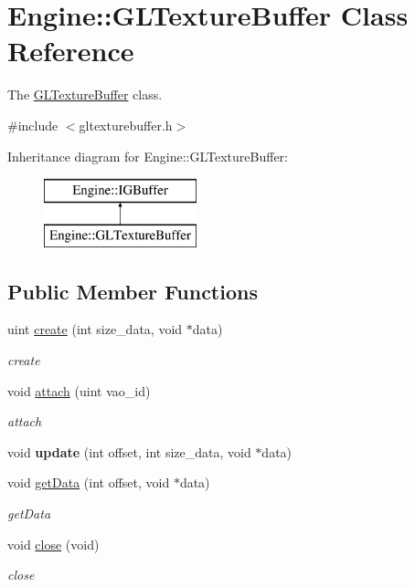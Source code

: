 \hypertarget{classEngine_1_1GLTextureBuffer}{}\section{Engine\+:\+:G\+L\+Texture\+Buffer Class Reference}
\label{classEngine_1_1GLTextureBuffer}


The \hyperlink{classEngine_1_1GLTextureBuffer}{G\+L\+Texture\+Buffer} class.  




{\ttfamily \#include $<$gltexturebuffer.\+h$>$}

Inheritance diagram for Engine\+:\+:G\+L\+Texture\+Buffer\+:\begin{figure}[H]
\begin{center}
\leavevmode
\includegraphics[height=2.000000cm]{classEngine_1_1GLTextureBuffer}
\end{center}
\end{figure}
\subsection*{Public Member Functions}
\begin{DoxyCompactItemize}
\item 
uint \hyperlink{classEngine_1_1GLTextureBuffer_aac493af54205e536a3ae7df812710f78}{create} (int size\+\_\+data, void $\ast$data)
\begin{DoxyCompactList}\small\item\em create \end{DoxyCompactList}\item 
void \hyperlink{classEngine_1_1GLTextureBuffer_a6b060dc1c33a9df000c011170daa46e2}{attach} (uint vao\+\_\+id)
\begin{DoxyCompactList}\small\item\em attach \end{DoxyCompactList}\item 
\hypertarget{classEngine_1_1GLTextureBuffer_abcda46bee777984efc9f6c485b6cb1ed}{}void {\bfseries update} (int offset, int size\+\_\+data, void $\ast$data)\label{classEngine_1_1GLTextureBuffer_abcda46bee777984efc9f6c485b6cb1ed}

\item 
void \hyperlink{classEngine_1_1GLTextureBuffer_a20a3044796531245f0c0926fdda52872}{get\+Data} (int offset, void $\ast$data)
\begin{DoxyCompactList}\small\item\em get\+Data \end{DoxyCompactList}\item 
void \hyperlink{classEngine_1_1GLTextureBuffer_ab64ccc1b8646be8d288b0781267fd909}{close} (void)
\begin{DoxyCompactList}\small\item\em close \end{DoxyCompactList}\end{DoxyCompactItemize}
